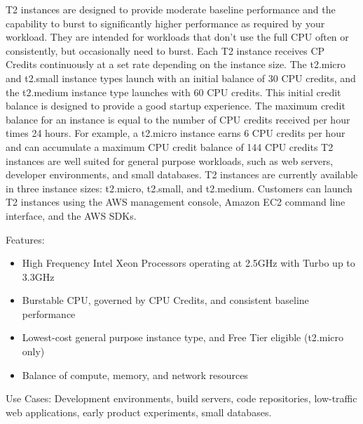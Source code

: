 \documentclass[10pt, conference]{IEEEtran}
\begin{document}
T2 instances are designed to provide moderate baseline performance and the capability to burst to significantly higher performance as required by your workload. They are intended for workloads that don't use the full CPU often or consistently, but occasionally need to burst. 
Each T2 instance receives CP Credits continuously at a set rate depending on the instance size.  The t2.micro and t2.small instance types launch with an initial balance of 30 CPU credits, and the t2.medium instance type launches with 60 CPU credits. This initial credit balance is designed to provide a good startup experience. The maximum credit balance for an instance is equal to the number of CPU credits received per hour times 24 hours. For example, a t2.micro instance earns 6 CPU credits per hour and can accumulate a maximum CPU credit balance of 144 CPU credits
T2 instances are well suited for general purpose workloads, such as web servers, developer environments, and small databases. T2 instances are currently available in three instance sizes: t2.micro, t2.small, and t2.medium. Customers can launch T2 instances using the AWS management console, Amazon EC2 command line interface, and the AWS SDKs. 

Features:

\begin{itemize}

\item High Frequency Intel Xeon Processors operating at 2.5GHz with Turbo up to 3.3GHz
\item Burstable CPU, governed by CPU Credits, and consistent baseline performance
\item Lowest-cost general purpose instance type, and Free Tier eligible (t2.micro only)
\item Balance of compute, memory, and network resources

\end{itemize}

Use Cases: Development environments, build servers, code repositories, low-traffic web applications, early product experiments, small databases.  
\end{document}
